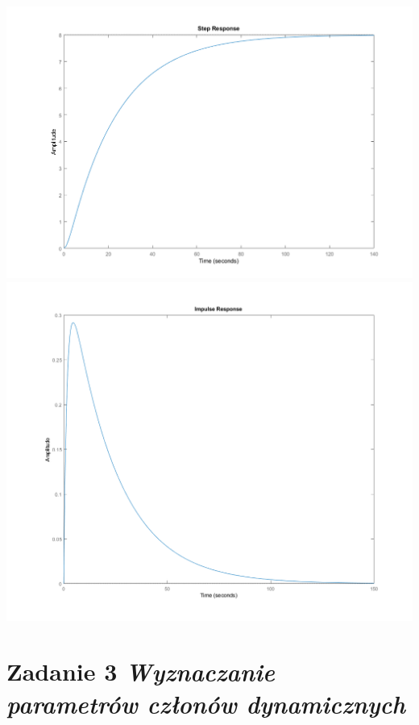 \documentclass[a4paper,10pt]{article}
\begin{document}
\begin{itemize}
	\begin{center}
		\includegraphics[width=15cm]{osc_step.png}
		\includegraphics[width=15cm]{osc_impulse.png}
	\end{center}
\end{itemize}

\section{Zadanie 3 \textit{\small Wyznaczanie parametrów członów dynamicznych}}\label{sec:zad3}
\end{document}
